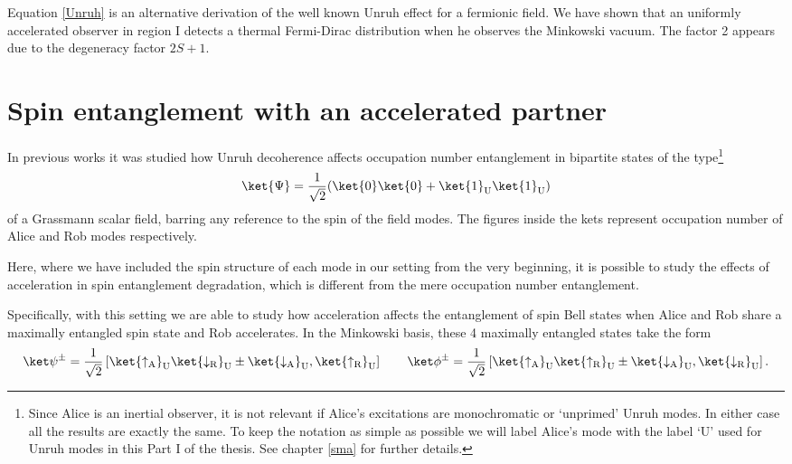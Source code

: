 Equation \eqref{Unruh} is an alternative derivation of the well known Unruh effect \cite{DaviesUnr,Unruh} for a fermionic field. We have shown that an uniformly accelerated observer in region I detects a thermal Fermi-Dirac distribution when he observes the Minkowski vacuum. The factor 2 appears due to the degeneracy factor $2S+1$.

\section{Spin entanglement with an accelerated partner}\label{sec5}

In previous works \cite{Alicefalls,AlsingSchul} it was studied how Unruh decoherence affects occupation number entanglement in bipartite states of the type\footnote{Since Alice is an inertial observer, it is not relevant if Alice's excitations are monochromatic or `unprimed' Unruh modes. In either case all the results are exactly the same. To keep the notation as simple as possible we will label Alice's mode with the label `U' used for Unruh modes in this Part I of the thesis. See chapter \ref{sma} for further details.}
\begin{equation}\label{alsingst}
\ket{\Psi}=\frac{1}{\sqrt2}(\ket{0}\ket{0}+\ket{1}_\text{U}\ket{1}_\text{U})
\end{equation}of a  Grassmann scalar field, barring any reference to the spin of the field modes. The figures inside the kets represent occupation number of Alice and Rob modes respectively.

Here, where we have included the spin structure of each mode in our setting from the very beginning, it is possible to study the effects of acceleration in spin entanglement degradation, which is different from the mere occupation number entanglement.

Specifically, with this setting we are able to study how acceleration affects the entanglement of spin Bell states when Alice and Rob share a maximally entangled spin state and Rob accelerates. In the Minkowski basis, these 4 maximally entangled states take the form
\begin{equation}\label{Bellstates}\ket\psi^\pm=\frac{1}{\sqrt2}\left[\ket{\uparrow_\text{A}}_\text{U}\ket{\downarrow_\text{R}}_\text{U}\pm\ket{\downarrow_\text{A}}_\text{U},\ket{\uparrow_\text{R}}_\text{U}\right]\qquad\ket\phi^\pm=\frac{1}{\sqrt2}\left[\ket{\uparrow_\text{A}}_\text{U}\ket{\uparrow_\text{R}}_\text{U}\pm\ket{\downarrow_\text{A}}_\text{U},\ket{\downarrow_\text{R}}_\text{U}\right].\end{equation}

